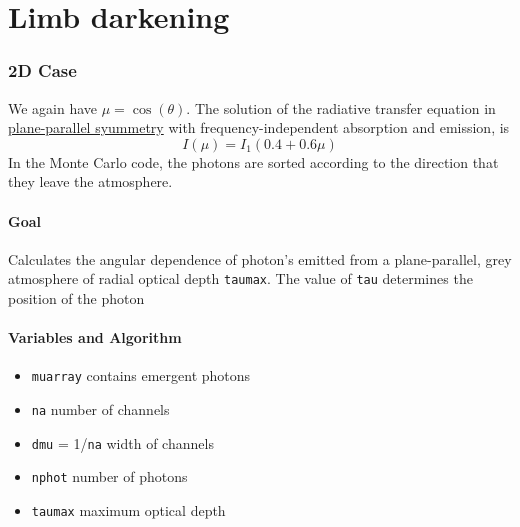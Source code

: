 \documentclass[../main/main.tex]{subfiles}
\begin{document}
\newpage
\section{Limb darkening}

\label{limb_darkening_discussion}

\subsubsection{2D Case}
We again have $\mu = \cos(\theta)$. The solution of the radiative transfer equation in \underline{plane-parallel syummetry} with frequency-independent absorption and emission, is 
\begin{equation}
I(\mu) = I_1 (0.4 + 0.6\mu)
\end{equation}
In the Monte Carlo code, the photons are sorted according to the direction that they leave the atmosphere.

\paragraph{Goal}
Calculates the angular dependence of photon's emitted from a plane-parallel, grey atmosphere of radial optical depth \texttt{taumax}. The value of \texttt{tau} determines the position of the photon

\paragraph{Variables and Algorithm}
\begin{itemize}
\item \texttt{muarray} contains emergent photons
\item \texttt{na} number of channels
\item \texttt{dmu} = 1/\texttt{na} width of channels
\item \texttt{nphot} number of photons
\item \texttt{taumax} maximum optical depth
\end{itemize}
\end{document}
